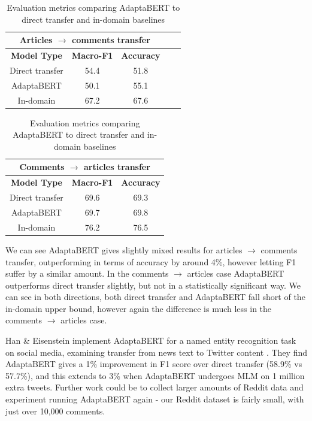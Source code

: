 \begin{table}[ht]
    \begin{center}
        \begin{tabular}{|c|c|c|c|c|}
            \hline
            \multicolumn{3}{|c|}{\textbf{Articles $ \rightarrow $ comments transfer}} \\
            \hline
            \textbf{Model Type} & \textbf{Macro-F1} & \textbf{Accuracy} \\
            \hline
            Direct transfer & 54.4 & 51.8  \\
            AdaptaBERT & 50.1 & 55.1 \\
            \hline
            In-domain & 67.2 & 67.6 \\
            \hline
        \end{tabular}
    \end{center} \vspace{10pt}
    \begin{center}
        \begin{tabular}{|c|c|c|}
            \hline
            \multicolumn{3}{|c|}{\textbf{Comments $ \rightarrow $ articles transfer}} \\
            \hline
            \textbf{Model Type} & \textbf{Macro-F1} & \textbf{Accuracy} \\
            \hline
            Direct transfer & 69.6 & 69.3  \\
            AdaptaBERT & 69.7 & 69.8 \\
            \hline
            In-domain & 76.2 & 76.5  \\
            \hline
        \end{tabular}
    \end{center}
    \caption{Evaluation metrics comparing AdaptaBERT to direct transfer and in-domain baselines}
    \label{tab:adaptabert-results}
\end{table}

We can see AdaptaBERT gives slightly mixed results for articles $ \rightarrow $ comments transfer, outperforming in terms of accuracy by around 4\%, however letting F1 suffer by a similar amount. In the comments $ \rightarrow $ articles case AdaptaBERT outperforms direct transfer slightly, but not in a statistically significant way. We can see in both directions, both direct transfer and AdaptaBERT fall short of the in-domain upper bound, however again the difference is much less in the comments $ \rightarrow $ articles case.

Han \& Eisenstein implement AdaptaBERT for a named entity recognition task on social media, examining transfer from news text to Twitter content \cite{adaptabert}. They find AdaptaBERT gives a 1\% improvement in F1 score over direct transfer (58.9\% vs 57.7\%), and this extends to 3\% when AdaptaBERT undergoes MLM on 1 million extra tweets. Further work could be to collect larger amounts of Reddit data and experiment running AdaptaBERT again - our Reddit dataset is fairly small, with just over 10,000 comments.

